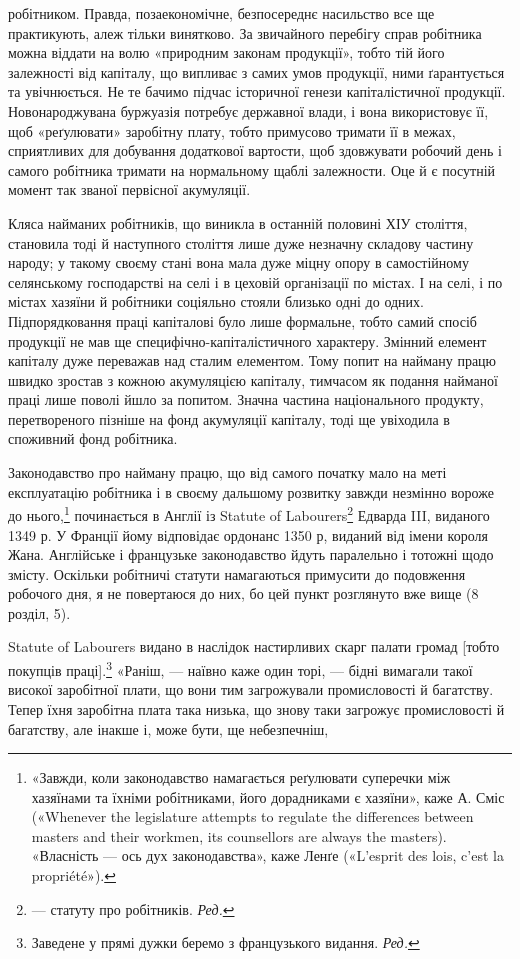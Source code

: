 \parcont{}  %
робітником. Правда, позаекономічне, безпосереднє насильство
все ще практикують, алеж тільки винятково. За звичайного
перебігу справ робітника можна віддати на волю «природним
законам продукції», тобто тій його залежності від капіталу,
що випливає з самих умов продукції, ними ґарантується та увічнюється.
Не те бачимо підчас історичної генези капіталістичної
продукції. Новонароджувана буржуазія потребує державної
влади, і вона використовує її, щоб «реґулювати» заробітну плату,
тобто примусово тримати її в межах, сприятливих для добування
додаткової вартости, щоб здовжувати робочий день і самого робітника
тримати на нормальному щаблі залежности. Оце й є
посутній момент так званої первісної акумуляції.

Кляса найманих робітників, що виникла в останній половині
ХІУ століття, становила тоді й наступного століття лише дуже
незначну складову частину народу; у такому своєму стані вона
мала дуже міцну опору в самостійному селянському господарстві
на селі і в цеховій організації по містах. І на селі, і по містах
хазяїни й робітники соціяльно стояли близько одні до одних.
Підпорядковання праці капіталові було лише формальне, тобто
самий спосіб продукції не мав ще специфічно-капіталістичного
характеру. Змінний елемент капіталу дуже переважав над сталим
елементом. Тому попит на найману працю швидко зростав
з кожною акумуляцією капіталу, тимчасом як подання найманої
праці лише поволі йшло за попитом. Значна частина національного
продукту, перетвореного пізніше на фонд акумуляції капіталу,
тоді ще увіходила в споживний фонд робітника.

Законодавство про найману працю, що від самого початку
мало на меті експлуатацію робітника і в своєму дальшому розвитку
завжди незмінно вороже до нього,\footnote{
«Завжди, коли законодавство намагається реґулювати суперечки
між хазяїнами та їхніми робітниками, його дорадниками є хазяїни», каже
А. Сміс («Whenever the legislature attempts to regulate the differences
between masters and their workmen, its counsellors are always the masters).
«Власність — ось дух законодавства», каже Ленґе («L’esprit des
lois, c’est la propriété»).
} починається в Англії
із Statute of Labourers\footnote*{
— статуту про робітників. \emph{Ред.}
} Едварда III, виданого 1349 р. У Франції
йому відповідає ордонанс 1350 р, виданий від імени короля
Жана. Англійське і французьке законодавство йдуть паралельно
і тотожні щодо змісту. Оскільки робітничі статути намагаються
примусити до подовження робочого дня, я не повертаюся до них,
бо цей пункт розглянуто вже вище (8 розділ, 5).

Statute of Labourers видано в наслідок настирливих скарг
палати громад [тобто покупців праці].\footnote*{
Заведене у прямі дужки беремо з французького видання. \emph{Ред.}
} «Раніш, — наївно каже
один торі, — бідні вимагали такої високої заробітної плати, що
вони тим загрожували промисловості й багатству. Тепер їхня
заробітна плата така низька, що знову таки загрожує промисловості
й багатству, але інакше і, може бути, ще небезпечніш,
\parbreak{}  %
